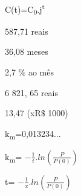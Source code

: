 \begin{respostas}{8}

    \ansitem{} C(t)=C\textsubscript{0}.j\textsuperscript{t}

    \ansitem{} 587,71 reais

    \ansitem{} 36,08 meses

    \ansitem{} 2,7 $\%$  ao mês 

    \ansitem{} 6 821, 65 reais

    \ansitem{} 13,47 (xR$\$$ 1000)

    \ansitem{} k\textsubscript{m}=0,013234...

    \ansitem{} k\textsubscript{m}=  \( -\frac{1}{t} . ln \left( \frac{P}{P \left( 0 \right) } \right)  \)  

    \ansitem{} t=  \( -\frac{1}{x} .ln \left( \frac{P}{P \left( 0 \right) } \right)  \) 

\end{respostas}
